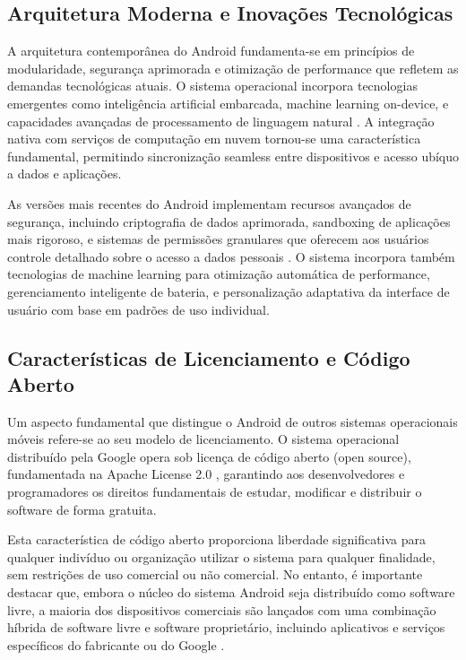 \subsection{Arquitetura Moderna e Inovações Tecnológicas}
A arquitetura contemporânea do Android fundamenta-se em princípios de modularidade, segurança aprimorada e otimização de performance que refletem as demandas tecnológicas atuais. O sistema operacional incorpora tecnologias emergentes como inteligência artificial embarcada, machine learning on-device, e capacidades avançadas de processamento de linguagem natural \cite{appventurez2024trends}. A integração nativa com serviços de computação em nuvem tornou-se uma característica fundamental, permitindo sincronização seamless entre dispositivos e acesso ubíquo a dados e aplicações.

As versões mais recentes do Android implementam recursos avançados de segurança, incluindo criptografia de dados aprimorada, sandboxing de aplicações mais rigoroso, e sistemas de permissões granulares que oferecem aos usuários controle detalhado sobre o acesso a dados pessoais \cite{buildfire2024trends}. O sistema incorpora também tecnologias de machine learning para otimização automática de performance, gerenciamento inteligente de bateria, e personalização adaptativa da interface de usuário com base em padrões de uso individual.


\subsection{Características de Licenciamento e Código Aberto}

Um aspecto fundamental que distingue o Android de outros sistemas operacionais móveis refere-se ao seu modelo de licenciamento. O sistema operacional distribuído pela Google opera sob licença de código aberto (open source), fundamentada na Apache License 2.0 \cite{opensource2023}, garantindo aos desenvolvedores e programadores os direitos fundamentais de estudar, modificar e distribuir o software de forma gratuita.

Esta característica de código aberto proporciona liberdade significativa para qualquer indivíduo ou organização utilizar o sistema para qualquer finalidade, sem restrições de uso comercial ou não comercial. No entanto, é importante destacar que, embora o núcleo do sistema Android seja distribuído como software livre, a maioria dos dispositivos comerciais são lançados com uma combinação híbrida de software livre e software proprietário, incluindo aplicativos e serviços específicos do fabricante ou do Google \cite{lee2022}.


